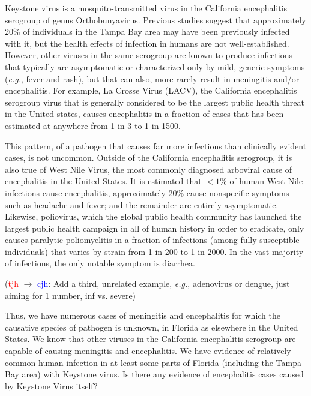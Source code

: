 \documentclass[12pt]{article}
\newcommand{\eg}{\textit{e.g.}}
\newcommand{\cjh}{\textcolor{blue}{cjh}}
\newcommand{\tjh}{\textcolor{red}{tjh}}
\newcommand{\msg}[3]{(#1 $\rightarrow$ #2: #3)}
\newcommand{\mtc}[1]{\msg\tjh\cjh{#1}}
\begin{document}
        Keystone virus is a mosquito-transmitted virus in the California encephalitis serogroup of genus Orthobunyavirus. Previous studies suggest that approximately 20\% of individuals in the Tampa Bay area may have been previously infected with it\cite{parkin1972review}, but the health effects of infection in humans are not well-established. However, other viruses in the same serogroup are known to produce infections that typically are asymptomatic or characterized only by mild, generic symptoms (\eg, fever and rash), but that can also, more rarely result in meningitis and/or encephalitis. For example, La Crosse Virus (LACV), the California encephalitis serogroup virus that is generally considered to be the largest public health threat in the United states, causes encephalitis in a fraction of cases that has been estimated at anywhere from 1 in 3 to 1 in 1500\cite{rust1999topical}. %

        This pattern, of a pathogen that causes far more infections than clinically evident cases, is not uncommon. Outside of the California encephalitis serogroup, it is also true of West Nile Virus, the most commonly diagnosed arboviral cause of encephalitis in the United States. It is estimated that $<1\%$ of human West Nile infections cause encephalitis, approximately 20\% cause nonspecific symptoms such as headache and fever; and the remainder are entirely asymptomatic\cite{cdc2018symptoms}. Likewise, poliovirus, which the global public health community has launched the largest public health campaign in all of human history in order to eradicate, only causes paralytic poliomyelitis in a fraction of infections (among fully susceptible individuals) that varies by strain from 1 in 200 to 1 in 2000. In the vast majority of infections, the only notable symptom is diarrhea.\cite{asdf}

        \mtc{Add a third, unrelated example, \eg, adenovirus or dengue, just aiming for 1 number, inf vs. severe}

        Thus, we have numerous cases of meningitis and encephalitis for which the causative species of pathogen is unknown, in Florida as elsewhere in the United States. We know that other viruses in the California encephalitis serogroup are capable of causing meningitis and encephalitis.  We have evidence of relatively common human infection in at least some parts of Florida (including the Tampa Bay area) with Keystone virus. Is there any evidence of encephalitis cases caused by Keystone Virus itself?
\end{document}
